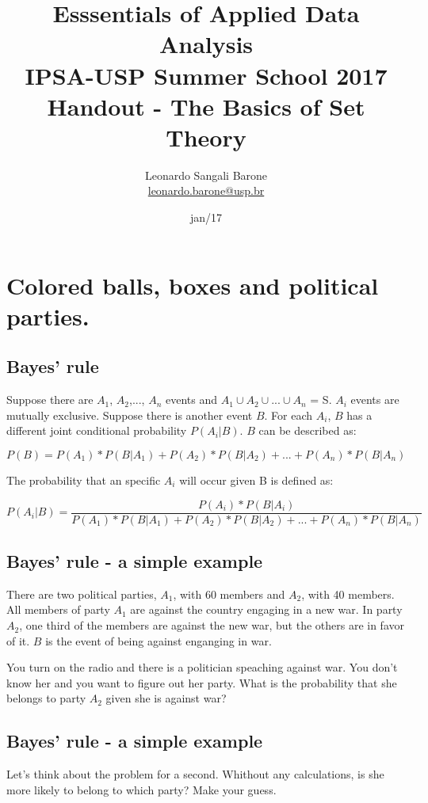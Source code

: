 \documentclass[11pt]{article}
\title{\textbf{Esssentials of Applied Data Analysis\\
				IPSA-USP Summer School 2017}\newline\\
				Handout - The Basics of Set Theory}
\author{Leonardo Sangali Barone\\ \href{leonardo.barone@usp.br}{leonardo.barone@usp.br}}
\date{jan/17}
\begin{document}
\maketitle

\section*{Colored balls, boxes and political parties.}


	\subsection*{Bayes' rule}
	Suppose there are $A_1$, $A_2$,..., $A_n$ events and $A_1 \cup A_2 \cup... \cup A_n$ = S. $A_i$ events are mutually exclusive. Suppose there is another event $B$. For each $A_i$, $B$ has a different joint conditional probability $P(A_i|B)$. $B$ can be described as:
	
	\[P(B) = P(A_1)*P(B|A_1)+P(A_2)*P(B|A_2)+...+P(A_n)*P(B|A_n)\]
 
	The probability that an specific $A_i$ will occur given B is defined as:

	\[P(A_i|B) = \frac{P(A_i)*P(B|A_i)}{P(A_1)*P(B|A_1)+P(A_2)*P(B|A_2)+...+P(A_n)*P(B|A_n)}\]
		


	\subsection*{Bayes' rule - a simple example}
	There are two political parties, $A_1$, with 60 members and $A_2$, with 40 members. All members of party $A_1$ are against the country engaging in a new war. In party $A_2$, one third of the members are against the new war, but the others are in favor of it. $B$ is the event of being against enganging in war.
	 
	You turn on the radio and there is a politician speaching against war. You don't know her and you want to figure out her party. What is the probability that she belongs to party $A_2$ given she is against war?
		


	\subsection*{Bayes' rule - a simple example}
	Let's think about the problem for a second. Whithout any calculations, is she more likely to belong to which party? Make your guess.
	
\end{document}
